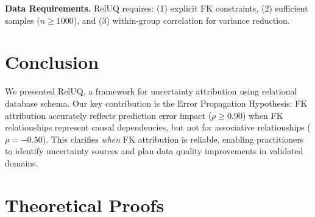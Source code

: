 \documentclass{article}
\begin{document}
\textbf{Data Requirements.}
RelUQ requires: (1) explicit FK constraints, (2) sufficient samples ($n \geq 1000$),
and (3) within-group correlation for variance reduction.

\section{Conclusion}

We presented RelUQ, a framework for uncertainty attribution using relational database schema.
Our key contribution is the Error Propagation Hypothesis: FK attribution accurately reflects
prediction error impact ($\rho \geq 0.90$) when FK relationships represent causal dependencies,
but not for associative relationships ($\rho = -0.50$). This clarifies \emph{when} FK
attribution is reliable, enabling practitioners to identify uncertainty sources and plan
data quality improvements in validated domains.




\newpage
\appendix
\section{Theoretical Proofs}
\label{app:proofs}
\end{document}
